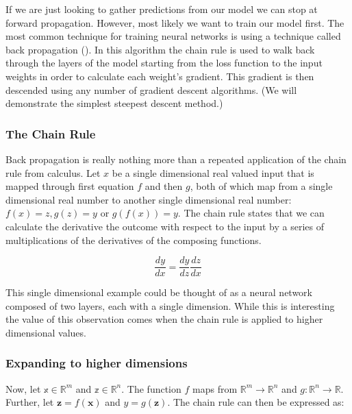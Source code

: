 \documentclass[]{book}
\theoremstyle{definition}
\theoremstyle{definition}
\theoremstyle{definition}
\theoremstyle{remark}
\begin{document}
If we are just looking to gather predictions from our model we can stop
at forward propagation. However, most likely we want to train our model
first. The most common technique for training neural networks is using a
technique called back propagation (\citet{backprop_1986}). In this
algorithm the chain rule is used to walk back through the layers of the
model starting from the loss function to the input weights in order to
calculate each weight's gradient. This gradient is then descended using
any number of gradient descent algorithms. (We will demonstrate the
simplest steepest descent method.)

\subsubsection{The Chain Rule}\label{the-chain-rule}

Back propagation is really nothing more than a repeated application of
the chain rule from calculus. Let \(x\) be a single dimensional real
valued input that is mapped through first equation \(f\) and then \(g\),
both of which map from a single dimensional real number to another
single dimensional real number: \(f(x) = z, g(z) = y\) or
\(g(f(x)) = y\). The chain rule states that we can calculate the
derivative the outcome with respect to the input by a series of
multiplications of the derivatives of the composing functions.

\begin{equation} 
  \frac{dy}{dx} = \frac{dy}{dz}\frac{dz}{dx}
  \label{eq:chainrule}
\end{equation}

This single dimensional example could be thought of as a neural network
composed of two layers, each with a single dimension. While this is
interesting the value of this observation comes when the chain rule is
applied to higher dimensional values.

\subsubsection{Expanding to higher
dimensions}\label{expanding-to-higher-dimensions}

Now, let \(\mathbb{x} \in \mathbb{R}^m\) and
\(\mathbb{z} \in \mathbb{R}^n\). The function \(f\) maps from
\(\mathbb{R}^m \to \mathbb{R}^n\) and
\(g: \mathbb{R}^n \to \mathbb{R}\). Further, let
\(\textbf{z} = f(\textbf{x})\) and \(y = g(\textbf{z})\). The chain rule
can then be expressed as:
\end{document}
